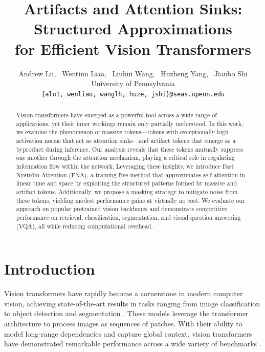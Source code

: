 \documentclass[10pt,twocolumn,letterpaper]{article}
\begin{document}
\title{Artifacts and Attention Sinks: Structured Approximations \\ for Efficient Vision Transformers}



\author{
Andrew Lu, \, Wentinn Liao, \, Liuhui Wang, \, Huzheng Yang, \, Jianbo Shi \\
University of Pennsylvania \\
{\tt\small \{alu1, wenliao, wanglh, huze, jshi\}@seas.upenn.edu}
}

\maketitle

\begin{abstract} 
Vision transformers have emerged as a powerful tool across a wide range of applications, yet their inner workings remain only partially understood. In this work, we examine the phenomenon of massive tokens—tokens with exceptionally high activation norms that act as attention sinks—and artifact tokens that emerge as a byproduct during inference. Our analysis reveals that these tokens mutually suppress one another through the attention mechanism, playing a critical role in regulating information flow within the network. Leveraging these insights, we introduce Fast Nystr\"om Attention (FNA), a training-free method that approximates self-attention in linear time and space by exploiting the structured patterns formed by massive and artifact tokens. Additionally, we propose a masking strategy to mitigate noise from these tokens, yielding modest performance gains at virtually no cost. We evaluate our approach on popular pretrained vision backbones and demonstrate competitive performance on retrieval, classification, segmentation, and visual question answering (VQA), all while reducing computational overhead. \end{abstract}
 \section{Introduction}
\label{sec:intro}

Vision transformers have rapidly become a cornerstone in modern computer vision, achieving state-of-the-art results in tasks ranging from image classification to object detection and segmentation \cite{he2022masked} \cite{oquab2023dinov2} \cite{radford2021clip} \cite{touvron2022deitiii}. These models leverage the transformer architecture to process images as sequences of patches. With their ability to model long-range dependencies and capture global context, vision transformers \cite{dosovitskiy2021vit} have demonstrated remarkable performance across a wide variety of benchmarks \cite{chen2015coco} \cite{deng2009imagenet} \cite{pascal-voc-2012} \cite{young2014flickr} \cite{zhou2017ade}.
\end{document}
